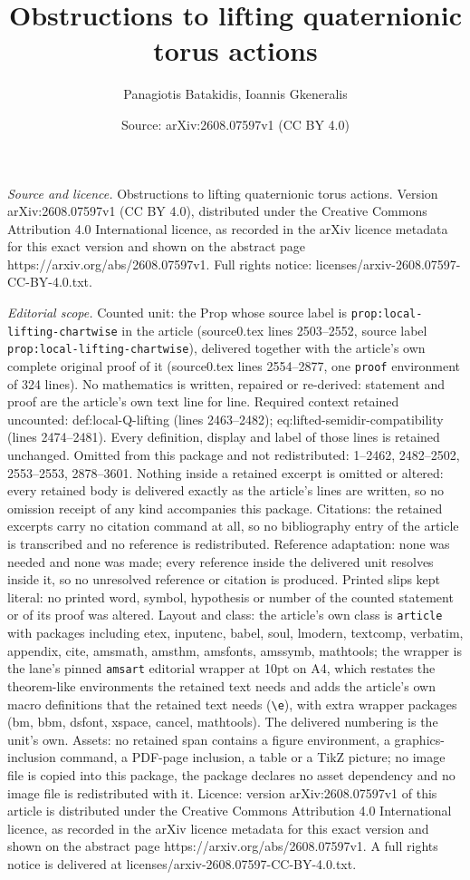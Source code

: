 \documentclass[10pt,a4paper]{amsart}
\title[Obstructions to lifting quaternionic torus actions]{Obstructions to lifting quaternionic torus actions}
\author{Panagiotis Batakidis, Ioannis Gkeneralis}
\date{Source: arXiv:2608.07597v1 (CC BY 4.0)}
\begin{document}
\maketitle

\noindent\emph{Source and licence.} Obstructions to lifting quaternionic torus actions. Version arXiv:2608.07597v1 (CC BY 4.0), distributed under the Creative Commons Attribution 4.0 International licence, as recorded in the arXiv licence metadata for this exact version and shown on the abstract page https://arxiv.org/abs/2608.07597v1. Full rights notice: licenses/arxiv-2608.07597-CC-BY-4.0.txt.\par\smallskip

\noindent\textit{Editorial scope.} Counted unit: the Prop whose source label is \texttt{prop:local-lifting-chartwise} in the article (source0.tex lines 2503--2552, source label \texttt{prop:local-lifting-chartwise}), delivered together with the article's own complete original proof of it (source0.tex lines 2554--2877, one \texttt{proof} environment of 324 lines). No mathematics is written, repaired or re-derived: statement and proof are the article's own text line for line. Required context retained uncounted: def:local-Q-lifting (lines 2463--2482); eq:lifted-semidir-compatibility (lines 2474--2481). Every definition, display and label of those lines is retained unchanged. Omitted from this package and not redistributed: 1--2462, 2482--2502, 2553--2553, 2878--3601. Nothing inside a retained excerpt is omitted or altered: every retained body is delivered exactly as the article's lines are written, so no omission receipt of any kind accompanies this package. Citations: the retained excerpts carry no citation command at all, so no bibliography entry of the article is transcribed and no reference is redistributed. Reference adaptation: none was needed and none was made; every reference inside the delivered unit resolves inside it, so no unresolved reference or citation is produced. Printed slips kept literal: no printed word, symbol, hypothesis or number of the counted statement or of its proof was altered. Layout and class: the article's own class is \texttt{article} with packages including etex, inputenc, babel, soul, lmodern, textcomp, verbatim, appendix, cite, amsmath, amsthm, amsfonts, amssymb, mathtools; the wrapper is the lane's pinned \texttt{amsart} editorial wrapper at 10pt on A4, which restates the theorem-like environments the retained text needs and adds the article's own macro definitions that the retained text needs (\texttt{\textbackslash e}), with extra wrapper packages (bm, bbm, dsfont, xspace, cancel, mathtools). The delivered numbering is the unit's own. Assets: no retained span contains a figure environment, a graphics-inclusion command, a PDF-page inclusion, a table or a TikZ picture; no image file is copied into this package, the package declares no asset dependency and no image file is redistributed with it. Licence: version arXiv:2608.07597v1 of this article is distributed under the Creative Commons Attribution 4.0 International licence, as recorded in the arXiv licence metadata for this exact version and shown on the abstract page https://arxiv.org/abs/2608.07597v1. A full rights notice is delivered at licenses/arxiv-2608.07597-CC-BY-4.0.txt. 
\end{document}
